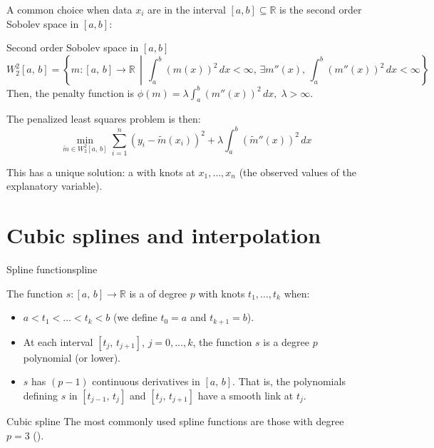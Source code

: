 A common choice when data $x_i$ are in the interval $[a,b] \subseteq \mathbb{R}$ is
the second order Sobolev space in $[a,b]$:
\begin{definition}{Second order Sobolev space}{} in $[a, b]$ 
    \begin{equation*}
        W_2^2[a,\,b] = \left\{
            m : [a,\,b] \to \mathbb{R} \,\middle|\,
            \int_a^b \left(m(x)\right)^2 \,dx < \infty,\,
            \exists m''(x),\,
            \int_a^b \left(m''(x)\right)^2 \,dx < \infty
            \right\}
    \end{equation*}
    \tcbline
    Then, the penalty function is $\phi(m) = \lambda \int_a^b \left(m''(x)\right)^2 \,dx,\;\lambda > \infty$.

    The penalized least squares problem is then:
    \begin{equation*}
        \min_{\tilde m \in W_2^2[a,\,b]}
        \sum_{i=1}^n \left(y_i - \tilde m(x_i)\right)^2
        + \lambda \int_a^b \left(\tilde m''(x)\right)^2 \,dx
    \end{equation*}

    This has a unique solution: a  with knots at $x_1,\ldots,x_n$
    (the observed values of the explanatory variable).
\end{definition}


\section[Cubic splines interpolation]{Cubic splines and interpolation}

\begin{definition}{Spline function}{spline}

    The function $s : [a,\,b] \to \mathbb{R}$ is a  of
    degree $p$ with knots $t_1, \ldots, t_k$ when:
    \begin{itemize}
        \item $a < t_1 < \ldots < t_k < b$ (we define $t_0 = a$ and $t_{k+1} = b$).
        \item At each interval $[t_j,\, t_{j+1}]$, $j=0,\ldots,k$, the function $s$ is
            a degree $p$ polynomial (or lower).
        \item $s$ has $(p-1)$ continuous derivatives in $[a,\,b]$. That is,
            the polynomials defining $s$ in $[t_{j-1},\, t_{j}]$ and $[t_j,\, t_{j+1}]$
            have a smooth link at $t_j$.
    \end{itemize}
    \tcblower
    \begin{note}{Cubic spline}{}
        The most commonly used spline functions are those with degree $p=3$ ().
    \end{note}
\end{definition}

